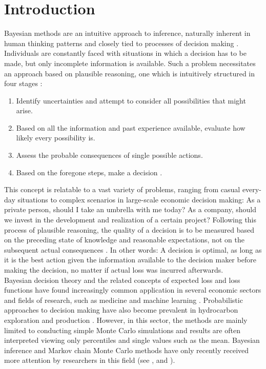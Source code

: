 \chapter{Introduction} \label{chap:intro}
Bayesian methods are an intuitive approach to inference, naturally inherent in human thinking patterns and closely tied to processes of decision making \citep{berger2013stat, davidson2015, jaynes1986bayesian}. Individuals are constantly faced with situations in which a decision has to be made, but only incomplete information is available. Such a problem necessitates an approach based on plausible reasoning, one which is intuitively structured in four stages \citep{jaynes1986bayesian}:
\begin{enumerate}
	\item Identify uncertainties and attempt to consider all possibilities that might arise.
	\item Based on all the information and past experience available, evaluate how likely every possibility is.
	\item Assess the probable consequences of single possible actions.
	\item Based on the foregone steps, make a decision \citep{jaynes1986bayesian}.
\end{enumerate}
This concept is relatable to a vast variety of problems, ranging from casual every-day situations to complex scenarios in large-scale economic decision making: As a private person, should I take an umbrella with me today? As a company, should we invest in the development and realization of a certain project? Following this process of plausible reasoning, the quality of a decision is to be measured based on the preceding state of knowledge and reasonable expectations, not on the subsequent actual consequences \citep{jaynes1986bayesian}. In other words: A decision is optimal, as long as it is the best action given the information available to the decision maker before making the decision, no matter if actual loss was incurred afterwards.\\
Bayesian decision theory and the related concepts of expected loss and loss functions have found increasingly common application in several economic sectors and fields of research, such as medicine \citep{ashby2000evidence, ashby2006bayesian, moye2006statistical} and machine learning \citep{barber2012bayesian, theodoridis2015machine}. Probabilistic approaches to decision making have also become prevalent in hydrocarbon exploration and production \citep{murtha1997monte, mudford2000valuing,bratvold2010making}. However, in this sector, the methods are mainly limited to conducting simple Monte Carlo simulations and results are often interpreted viewing only percentiles and single values such as the mean. Bayesian inference and Markov chain Monte Carlo methods have only recently received more attention by researchers in this field (see \citet{wadsley2005markov}, \citet{ma2006multistage} and \citet{liu2010continuous}).\\

